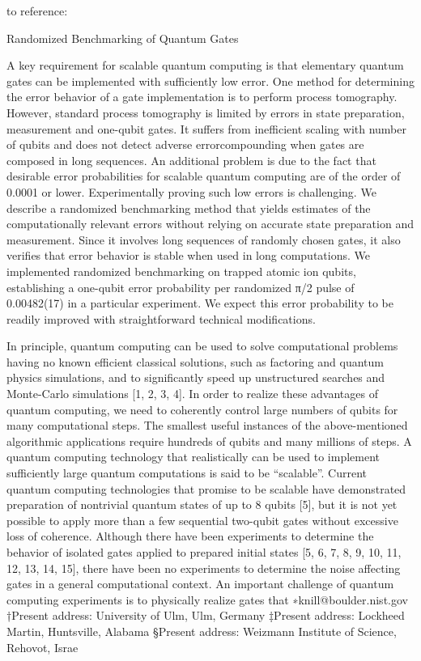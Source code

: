 to reference: \cite{knillRandomizedBenchmarkingQuantum2008_2008}

Randomized Benchmarking of Quantum Gates

A key requirement for scalable quantum computing is that elementary quantum gates can be implemented with sufficiently low error. One method for determining the error behavior of a gate implementation is to perform process tomography. However, standard process tomography is limited by errors in state preparation, measurement and one-qubit gates. It suffers from inefficient scaling with number of qubits and does not detect adverse errorcompounding when gates are composed in long sequences. An additional problem is due to the fact that desirable error probabilities for scalable quantum computing are of the order of 0.0001 or lower. Experimentally proving such low errors is challenging. We describe a randomized benchmarking method that yields estimates of the computationally relevant errors without relying on accurate state preparation and measurement. Since it involves long sequences of randomly chosen gates, it also verifies that error behavior is stable when used in long computations. We implemented randomized benchmarking on trapped atomic ion qubits, establishing a one-qubit error probability per randomized π/2 pulse of 0.00482(17) in a particular experiment. We expect this error probability to be readily improved with straightforward technical modifications.

In principle, quantum computing can be used to solve computational problems having no known efficient classical solutions, such as factoring and quantum physics simulations, and to significantly speed up unstructured searches and Monte-Carlo simulations [1, 2, 3, 4]. In order to realize these advantages of quantum computing, we need to coherently control large numbers of qubits for many computational steps. The smallest useful instances of the above-mentioned algorithmic applications require hundreds of qubits and many millions of steps. A quantum computing technology that realistically can be used to implement sufficiently large quantum computations is said to be “scalable”. Current quantum computing technologies that promise to be scalable have demonstrated preparation of nontrivial quantum states of up to 8 qubits [5], but it is not yet possible to apply more than a few sequential two-qubit gates without excessive loss of coherence. Although there have been experiments to determine the behavior of isolated gates applied to prepared initial states [5, 6, 7, 8, 9, 10, 11, 12, 13, 14, 15], there have been no experiments to determine the noise affecting gates in a general computational context. An important challenge of quantum computing experiments is to physically realize gates that ∗knill@boulder.nist.gov †Present address: University of Ulm, Ulm, Germany ‡Present address: Lockheed Martin, Huntsville, Alabama §Present address: Weizmann Institute of Science, Rehovot, Israe

